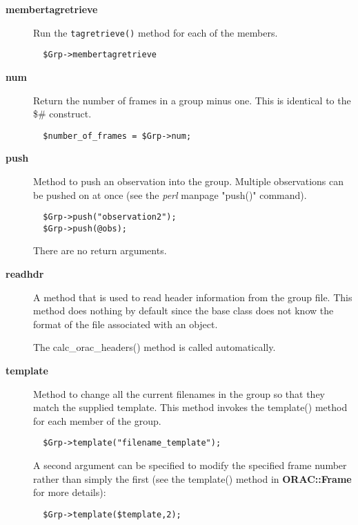 \begin{description}
\item[\textbf{membertagretrieve}] \mbox{}

Run the \texttt{tagretrieve()} method for each of the members.

\begin{verbatim}
  $Grp->membertagretrieve
\end{verbatim}
\item[\textbf{num}] \mbox{}

Return the number of frames in a group minus one.
This is identical to the \$\# construct.

\begin{verbatim}
  $number_of_frames = $Grp->num;
\end{verbatim}
\item[\textbf{push}] \mbox{}

Method to push an observation into the group. Multiple observations
can be pushed on at once (see the \emph{perl} manpage "push()" command).

\begin{verbatim}
  $Grp->push("observation2");
  $Grp->push(@obs);
\end{verbatim}


There are no return arguments.

\item[\textbf{readhdr}] \mbox{}

A method that is used to read header information from the group
file. This method does nothing by default since the base
class does not know the format of the file associated with an
object.



The calc\_orac\_headers() method is called automatically.

\item[\textbf{template}] \mbox{}

Method to change all the current filenames in the group so that they
match the supplied template. This method invokes the template()
method for each member of the group.

\begin{verbatim}
  $Grp->template("filename_template");
\end{verbatim}


A second argument can be specified to modify the specified frame
number rather than simply the first (see the template() method
in \textbf{ORAC::Frame} for more details):

\begin{verbatim}
  $Grp->template($template,2);
\end{verbatim}



\end{description}
